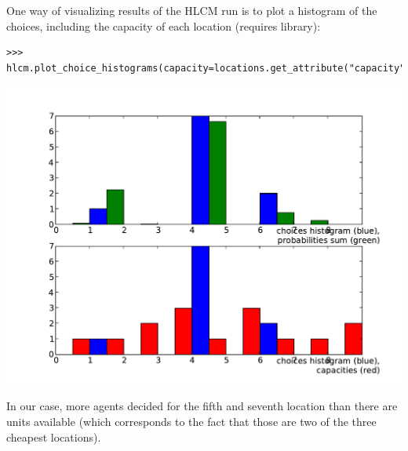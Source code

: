 One way of visualizing results of the HLCM run is to plot a 
histogram{} of the
choices, including the capacity of each location (requires 
library):

\begin{verbatim}
>>> hlcm.plot_choice_histograms(capacity=locations.get_attribute("capacity"))
\end{verbatim}
\begin{center}
\includegraphics[scale=0.5, angle=0]{images/hlcmhist.pdf}
\end{center}
In our case, more agents decided for the fifth and seventh location than there
are units available (which corresponds to the fact that those are two of the three cheapest locations).

